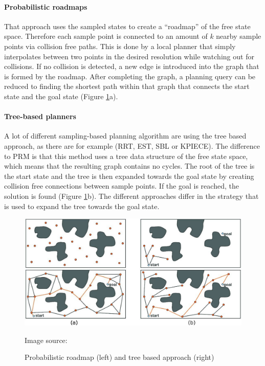 \paragraph{Probabilistic roadmaps}

That approach uses the sampled states to create a ``roadmap'' of the free state space. Therefore each sample point is connected to an amount of $k$ nearby sample points via collision free paths. This is done by a local planner that simply interpolates between two points in the desired resolution while watching out for collisions. If no collision is detected, a new edge is introduced into the graph that is formed by the roadmap. After completing the graph, a planning query can be reduced to finding the shortest path within that graph that connects the start state and the goal state (Figure \ref{fig:sampling_based}a).

\paragraph{Tree-based planners}

A lot of different sampling-based planning algorithm are using the tree based approach, as there are for example (RRT, EST, SBL or KPIECE). The difference to PRM is that this method uses a tree data structure of the free state space, which means that the resulting graph contains no cycles. The root of the tree is the start state and the tree is then expanded towards the goal state by creating collision free connections between sample points. If the goal is reached, the solution is found (Figure \ref{fig:sampling_based}b). The different approaches differ in the strategy that is used to expand the tree towards the goal state.\\

\begin{figure}[ht]
	\centering
  	\includegraphics[width=1.0\textwidth]{images/sampling_based.jpg}
	\caption[Sampling based algorithms]{Probabilistic roadmap (left) and tree based approach (right)}
	{\scriptsize Image source: \citep{omplPrimer}}
	\label{fig:sampling_based}
\end{figure}

